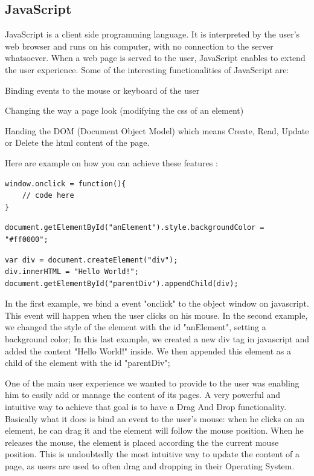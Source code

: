 \subsection{JavaScript}

JavaScript is a client side programming language. It is interpreted by the user's web browser and runs on his computer, with no connection to the server whatsoever. When a web page is served to the user, JavaScript enables to extend the user experience. Some of the interesting functionalities of JavaScript are:
\begin{itemize*}
\item Binding events to the mouse or keyboard of the user
\item Changing the way a page look (modifying the css of an element)
\item Handing the DOM (Document Object Model) which means Create, Read, Update or Delete the html content of the page.
\end{itemize*}

Here are example on how you can achieve these features :

\lstset{language=Javascript}
\begin{lstlisting}[label=javascript_event,caption=Binding an event in Javascript]
window.onclick = function(){
	// code here
}
\end{lstlisting}


\begin{lstlisting}[label=javascript_appearance,caption=Modifying the css of an element ]
document.getElementById("anElement").style.backgroundColor = "#ff0000";
\end{lstlisting}

\begin{lstlisting}[label=javascript_dom,caption=Handling the DOM]
var div = document.createElement("div");
div.innerHTML = "Hello World!";
document.getElementById("parentDiv").appendChild(div);
\end{lstlisting}

In the first example, we bind a event "onclick" to the object window on javascript. This event will happen when the user clicks on his mouse.
In the second example, we changed the style of the element with the id "anElement", setting a background color;
In this last example, we created a new div tag in javascript and added the content "Hello World!" inside. We then appended this element as a child of the element with the id "parentDiv";

One of the main user experience we wanted to provide to the user was enabling him to easily add or manage the content of its pages. A very powerful and intuitive way to achieve that goal is to have a Drag And Drop functionality. Basically what it does is bind an event to the user's mouse: when he clicks on an element, he can drag it and the element will follow the mouse position. When he releases the mouse, the element is placed according the the current mouse position. This is undoubtedly the most intuitive way to update the content of a page, as users are used to often drag and dropping in their Operating System. 

